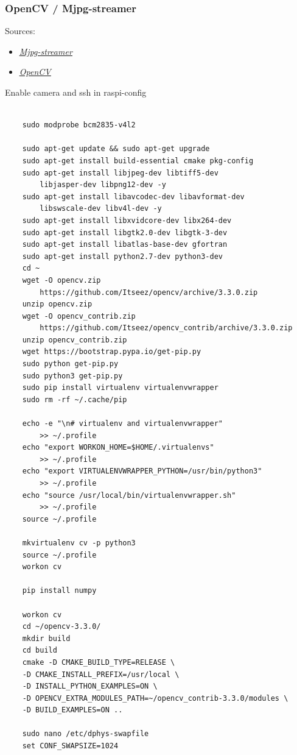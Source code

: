\documentclass[12pt]{article}
\begin{document}
	\subsubsection{OpenCV / Mjpg-streamer}
	Sources:
	\begin{itemize}
		\item \href{https://github.com/cncjs/cncjs/wiki/Setup-Guide:-Raspberry-Pi-\%7C-MJPEG-Streamer-Install-&-Setup-&-FFMpeg-Recording}{\emph{\underline{Mjpg-streamer}}}
		\item \href{https://www.pyimagesearch.com/2017/09/04/raspbian-stretch-install-opencv-3-python-on-your-raspberry-pi/}{\emph{\underline{OpenCV}}}
	\end{itemize}
	Enable camera and ssh in raspi-config
	\begin{lstlisting}
	
	sudo modprobe bcm2835-v4l2
	
	sudo apt-get update && sudo apt-get upgrade
	sudo apt-get install build-essential cmake pkg-config
	sudo apt-get install libjpeg-dev libtiff5-dev 
		libjasper-dev libpng12-dev -y
	sudo apt-get install libavcodec-dev libavformat-dev 
		libswscale-dev libv4l-dev -y
	sudo apt-get install libxvidcore-dev libx264-dev
	sudo apt-get install libgtk2.0-dev libgtk-3-dev
	sudo apt-get install libatlas-base-dev gfortran
	sudo apt-get install python2.7-dev python3-dev
	cd ~
	wget -O opencv.zip 
		https://github.com/Itseez/opencv/archive/3.3.0.zip
	unzip opencv.zip
	wget -O opencv_contrib.zip 
		https://github.com/Itseez/opencv_contrib/archive/3.3.0.zip
	unzip opencv_contrib.zip
	wget https://bootstrap.pypa.io/get-pip.py
	sudo python get-pip.py
	sudo python3 get-pip.py
	sudo pip install virtualenv virtualenvwrapper
	sudo rm -rf ~/.cache/pip
	
	echo -e "\n# virtualenv and virtualenvwrapper" 
		>> ~/.profile
	echo "export WORKON_HOME=$HOME/.virtualenvs" 
		>> ~/.profile
	echo "export VIRTUALENVWRAPPER_PYTHON=/usr/bin/python3" 
		>> ~/.profile
	echo "source /usr/local/bin/virtualenvwrapper.sh" 
		>> ~/.profile
	source ~/.profile
	
	mkvirtualenv cv -p python3
	source ~/.profile
	workon cv
	
	pip install numpy
	
	workon cv
	cd ~/opencv-3.3.0/
	mkdir build
	cd build
	cmake -D CMAKE_BUILD_TYPE=RELEASE \
	-D CMAKE_INSTALL_PREFIX=/usr/local \
	-D INSTALL_PYTHON_EXAMPLES=ON \
	-D OPENCV_EXTRA_MODULES_PATH=~/opencv_contrib-3.3.0/modules \
	-D BUILD_EXAMPLES=ON ..
	
	sudo nano /etc/dphys-swapfile
	set CONF_SWAPSIZE=1024
	

\end{lstlisting}
\end{document}
